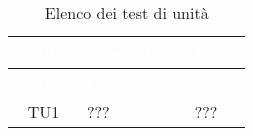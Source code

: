 {
\renewcommand{\arraystretch}{1.5}
\centering
\begin{longtable}{ c  C{8.5cm} C{3cm}}
\caption{Elenco dei test di unità}\\
\textcolor{white}{\textbf{Codice}} & \textcolor{white}{\textbf{Descrizione}} & \textcolor{white}{\textbf{Stato}}\\
\endfirsthead
{}
\textcolor{white}{\textbf{Codice}} & \textcolor{white}{\textbf{Descrizione}} & \textcolor{white}{\textbf{Stato}}\\
\endhead

TU1 & ??? & ??? \\

\end{longtable}
}